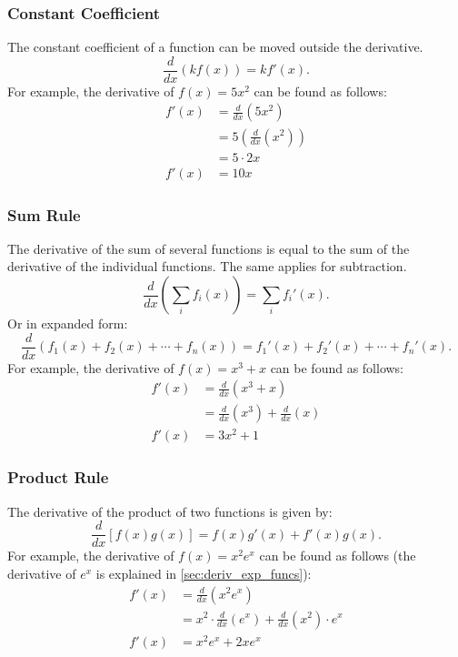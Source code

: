 \documentclass[12pt]{article}
\begin{document}
\subsubsection{Constant Coefficient}
The constant coefficient of a function can be moved outside the derivative.
\[ \frac{d}{dx} \left( k f(x) \right) = k f'(x). \]
For example, the derivative of $f(x) = 5x^2$ can be found as follows:
\begin{align*}
	f'(x) &= \frac{d}{dx} \left( 5x^2 \right) \\[5pt]
	&= 5 \left( \frac{d}{dx} \left( x^2 \right) \right) \\
	&= 5 \cdot 2x \\
	f'(x) &= 10x
\end{align*}

\subsubsection{Sum Rule}
The derivative of the sum of several functions is equal to the sum of the derivative of the individual functions. The same applies for subtraction.
\[ \frac{d}{dx} \left( \sum_i f_i(x) \right) = \sum_i f_i'(x). \]
Or in expanded form:
\[ \frac{d}{dx} \left( f_1(x) + f_2(x) + \cdots + f_n(x) \right) = f_1'(x) + f_2'(x) + \cdots + f_n'(x). \]
For example, the derivative of $f(x) = x^3 + x$ can be found as follows:
\begin{align*}
	f'(x) &= \frac{d}{dx} \left( x^3 + x \right) \\[5pt]
	&= \frac{d}{dx} \left( x^3 \right) + \frac{d}{dx} (x) \\[5pt]
	f'(x) &= 3x^2 + 1
\end{align*}

\subsubsection{Product Rule}
The derivative of the product of two functions is given by:
\[ \frac{d}{dx} \left[ f(x) g(x) \right] = f(x) g'(x) + f'(x) g(x). \]
For example, the derivative of $f(x) = x^2 e^x$ can be found as follows (the derivative of $e^x$ is explained in \ref{sec:deriv_exp_funcs}):
\begin{align*}
	f'(x) &= \frac{d}{dx} \left( x^2 e^x \right) \\[5pt]
	&= x^2 \cdot \frac{d}{dx} \left( e^x \right) + \frac{d}{dx} \left( x^2 \right) \cdot e^x \\[5pt]
	f'(x) &= x^2 e^x + 2x e^x
\end{align*}
\end{document}
